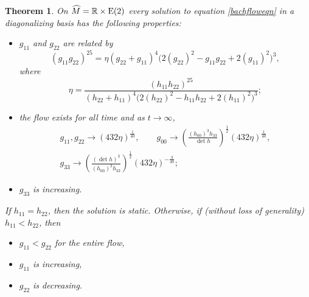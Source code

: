 \documentclass[pdftex]{sigma}
\numberwithin{equation}{section}
\newtheorem{Theorem}{Theorem}[section]
\begin{document}
\begin{Theorem} \label{e2thm}
On $\widehat{M} = \mathbb{R} \times {\rm E}(2)$ every solution to equation \eqref{bachfloweqn} in a diagonalizing basis has the following properties:
\begin{itemize}\itemsep=0pt
\item $g_{11}$ and $g_{22}$ are related by
\[
(g_{11} g_{22})^{25} = \eta (g_{22} + g_{11})^{4} \big(2(g_{22})^2 - g_{11} g_{22} + 2(g_{11})^2\big)^{3},
\]
where
\[
\eta = \frac{(h_{11} h_{22})^{25}}{(h_{22} + h_{11})^{4}
				\big(2(h_{22})^2 - h_{11} h_{22} + 2(h_{11})^2\big)^{3}};
\]
\item the flow exists for all time and as $t \rightarrow \infty$,
\begin{gather*}
g_{11}, g_{22} \rightarrow (432 \eta)^{\frac{1}{40}}, \qquad
g_{00} \rightarrow \left(\frac{(h_{00})^3 h_{33}}{\det h} \right)^{\frac{1}{2}} (432 \eta)^{\frac{1}{40}}, \\
g_{33} \rightarrow \left( \frac{(\det h)^{3}}{(h_{00})^{3} h_{33}} \right)^{\frac{1}{2}} (432 \eta)^{-\frac{3}{40}};
\end{gather*}
\item $g_{33}$ is increasing.
\end{itemize}
If $h_{11} = h_{22}$, then the solution is static. Otherwise, if (without loss of generality) $h_{11} < h_{22}$, then
\begin{itemize}\itemsep=0pt
\item $g_{11} < g_{22}$ for the entire flow,
\item $g_{11}$ is increasing,
\item $g_{22}$ is decreasing.
\end{itemize}
\end{Theorem}
\end{document}
